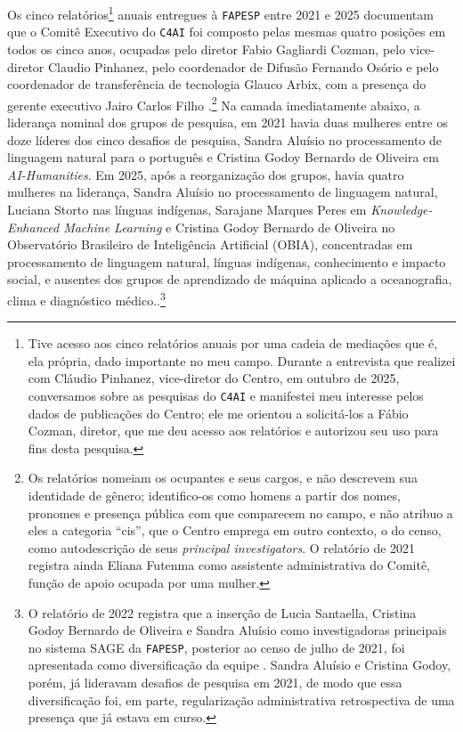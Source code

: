 Os cinco relatórios\footnote{Tive acesso aos cinco relatórios anuais por uma cadeia de mediações que é, ela própria, dado importante no meu campo. Durante a entrevista que realizei com Cláudio Pinhanez, vice-diretor do Centro, em outubro de 2025, conversamos sobre as pesquisas do \texttt{C4AI} e manifestei meu interesse pelos dados de publicações do Centro; ele me orientou a solicitá-los a Fábio Cozman, diretor, que me deu acesso aos relatórios e autorizou seu uso para fins desta pesquisa.} anuais entregues à \texttt{FAPESP} entre 2021 e 2025 documentam que o Comitê Executivo do \texttt{C4AI} foi composto pelas mesmas quatro posições em todos os cinco anos, ocupadas pelo diretor Fabio Gagliardi Cozman, pelo vice-diretor Claudio Pinhanez, pelo coordenador de Difusão Fernando Osório e pelo coordenador de transferência de tecnologia Glauco Arbix, com a presença do gerente executivo Jairo Carlos Filho \parencite{C4AI2021, C4AI2022, C4AI2023, C4AI2024, C4AI2025}.\footnote{Os relatórios nomeiam os ocupantes e seus cargos, e não descrevem sua identidade de gênero; identifico-os como homens a partir dos nomes, pronomes e presença pública com que comparecem no campo, e não atribuo a eles a categoria \enquote{cis}, que o Centro emprega em outro contexto, o do censo, como autodescrição de seus \textit{principal investigators}. O relatório de 2021 registra ainda Eliana Futenma como assistente administrativa do Comitê, função de apoio ocupada por uma mulher.} Na camada imediatamente abaixo, a liderança nominal dos grupos de pesquisa, em 2021 havia duas mulheres entre os doze líderes dos cinco desafios de pesquisa, Sandra Aluísio no processamento de linguagem natural para o português e Cristina Godoy Bernardo de Oliveira em \textit{AI-Humanities}. Em 2025, após a reorganização dos grupos, havia quatro mulheres na liderança, Sandra Aluísio no processamento de linguagem natural, Luciana Storto nas línguas indígenas, Sarajane Marques Peres em \textit{Knowledge-Enhanced Machine Learning} e Cristina Godoy Bernardo de Oliveira no Observatório Brasileiro de Inteligência Artificial (OBIA), concentradas em processamento de linguagem natural, línguas indígenas, conhecimento e impacto social, e ausentes dos grupos de aprendizado de máquina aplicado a oceanografia, clima e diagnóstico médico.\parencite{C4AI2021, C4AI2025}.\footnote{O relatório de 2022 registra que a inserção de Lucia Santaella, Cristina Godoy Bernardo de Oliveira e Sandra Aluísio como investigadoras principais no sistema SAGE da \texttt{FAPESP}, posterior ao censo de julho de 2021, foi apresentada como diversificação da equipe \parencite{C4AI2022}. Sandra Aluísio e Cristina Godoy, porém, já lideravam desafios de pesquisa em 2021, de modo que essa diversificação foi, em parte, regularização administrativa retrospectiva de uma presença que já estava em curso.}

